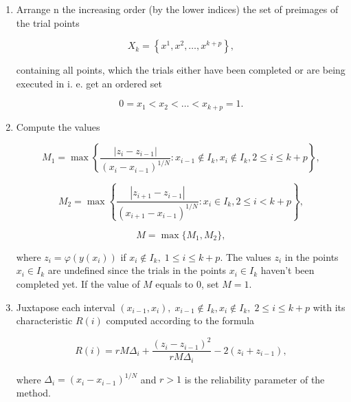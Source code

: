 \documentclass{svproc}
\begin{document}
\begin{enumerate} \item Arrange n the increasing order (by the lower indices) the set of preimages of the trial points
	
	\begin{displaymath} 
		X_k=\left\{x^1,x^2,\ldots,x^{k+p}\right\}, 
	\end{displaymath} 
	
	
	containing all points, which the trials either have been completed or are being executed in i. e. get an  ordered set 
	
	\begin{displaymath} 
		0=x_1<x_2<\ldots<x_{k+p}=1. 
	\end{displaymath} 
	
	
	\item Compute the values 
	
	\begin{displaymath} 
		M_1=\max{\left\{\frac{\left|z_i-z_{i-1}\right|}{\left(x_i-x_{i-1}\right)^{1/N}}:x_{i-1}\notin  I_k,x_i\notin I_k,2\le i\le k+p\right\}}, 
	\end{displaymath} 
	
	
	\begin{displaymath} 
		M_2=\max{\left\{\frac{\left|z_{i+1}-z_{i-1}\right|}{\left(x_{i+1}-x_{i-1}\right)^{1/N}}:x_i\in  I_k,2\le i<k+p\right\}}, 
	\end{displaymath} 
	
	
	\begin{displaymath} 
		M=\max{\{}M_1,M_2\}, 
	\end{displaymath} 
	
	
	where $ z_i=\varphi\left(y\left(x_i\right)\right)$ if $x_i\notin I_k,\;1\le i\le k+p$. The values $z_i$ in  the points $x_i\in I_k$ are undefined since the trials in the points $x_i\in I_k$ haven’t been completed  yet. If the value of $M$ equals to $0$, set $M=1$.
	
	\item Juxtapose each interval $\left(x_{i-1},x_i\right),\;x_{i-1}\notin I_k,x_i\notin I_k,\;2\le i\le  k+p$ with its characteristic $R\left(i\right)$ computed according to the formula 
	
	\begin{displaymath} 
		R\left(i\right)=rM\Delta_i+\frac{\left(z_i-z_{i-1}\right)^2}{rM\Delta_i}-2\left(z_i+z_{i-1}\right), 
	\end{displaymath} 
	
	
	where $\Delta_i=\left(x_i-x_{i-1}\right)^{1/N}$ and $ r>1$ is the reliability parameter of the method.
	

\end{enumerate}
\end{document}
